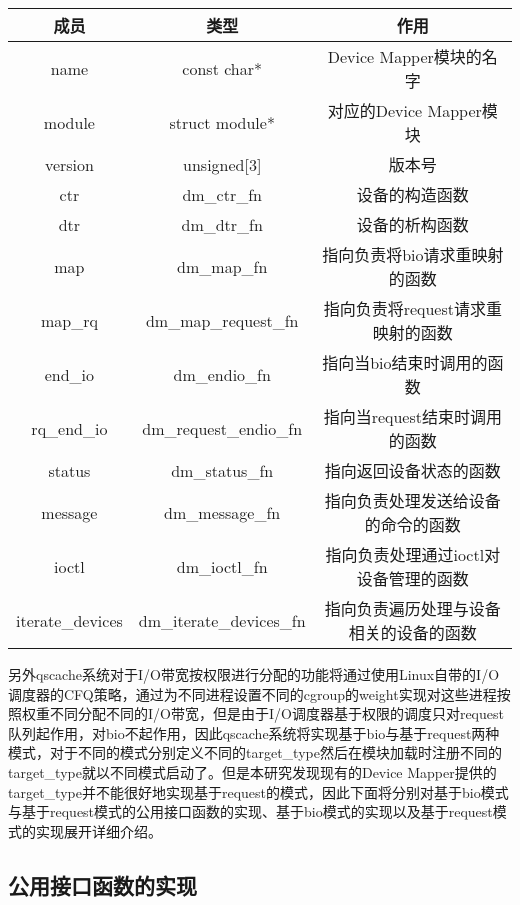 \begin{table}[!htbp]
    \centering
    \begin{tabular}{ccc} 
        \toprule
        成员 & 类型 & 作用\\
        \midrule
        name & const char* & Device Mapper模块的名字 \\ 
        module & struct module* & 对应的Device Mapper模块 \\ 
        version & unsigned[3] & 版本号 \\ 
        ctr & dm\_ctr\_fn & 设备的构造函数 \\ 
        dtr & dm\_dtr\_fn & 设备的析构函数 \\ 
        map & dm\_map\_fn & 指向负责将bio请求重映射的函数 \\ 
        map\_rq & dm\_map\_request\_fn & 指向负责将request请求重映射的函数 \\ 
        end\_io & dm\_endio\_fn & 指向当bio结束时调用的函数 \\ 
        rq\_end\_io & dm\_request\_endio\_fn & 指向当request结束时调用的函数 \\ 
        status & dm\_status\_fn & 指向返回设备状态的函数 \\ 
        message & dm\_message\_fn & 指向负责处理发送给设备的命令的函数 \\ 
        ioctl & dm\_ioctl\_fn & 指向负责处理通过ioctl对设备管理的函数 \\ 
        iterate\_devices & dm\_iterate\_devices\_fn & 指向负责遍历处理与设备相关的设备的函数 \\ 
        \bottomrule
    \end{tabular}
\end{table}

另外qscache系统对于I/O带宽按权限进行分配的功能将通过使用Linux自带的I/O调度器的CFQ策略，通过为不同进程设置不同的cgroup的weight实现对这些进程按照权重不同分配不同的I/O带宽，但是由于I/O调度器基于权限的调度只对request队列起作用，对bio不起作用，因此qscache系统将实现基于bio与基于request两种模式，对于不同的模式分别定义不同的target\_type然后在模块加载时注册不同的target\_type就以不同模式启动了。但是本研究发现现有的Device Mapper提供的target\_type并不能很好地实现基于request的模式，因此下面将分别对基于bio模式与基于request模式的公用接口函数的实现、基于bio模式的实现以及基于request模式的实现展开详细介绍。

\subsection{公用接口函数的实现}

